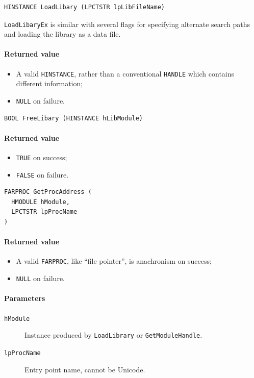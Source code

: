 \begin{verbatim}
HINSTANCE LoadLibary (LPCTSTR lpLibFileName)
\end{verbatim}
\texttt{LoadLibaryEx} is similar with several flags for specifying alternate search paths and loading the library as a data file.

\paragraph{Returned value}
\begin{itemize}
\item A valid \texttt{HINSTANCE}, rather than a conventional \texttt{HANDLE} which contains different information;
\item \texttt{NULL} on failure.
\end{itemize}

\begin{verbatim}
BOOL FreeLibary (HINSTANCE hLibModule)
\end{verbatim}

\paragraph{Returned value}
\begin{itemize}
\item \texttt{TRUE} on success;
\item \texttt{FALSE} on failure.
\end{itemize}

\begin{verbatim}
FARPROC GetProcAddress (
  HMODULE hModule,
  LPCTSTR lpProcName
)
\end{verbatim}

\paragraph{Returned value}
\begin{itemize}
\item A valid \texttt{FARPROC}, like ``file pointer'', is anachronism on success;
\item \texttt{NULL} on failure.
\end{itemize}

\paragraph{Parameters}
\begin{description}
\item [\texttt{hModule}] Instance produced by \texttt{LoadLibrary} or \texttt{GetModuleHandle}.
\item [\texttt{lpProcName}] Entry point name, cannot be Unicode.
\end{description}